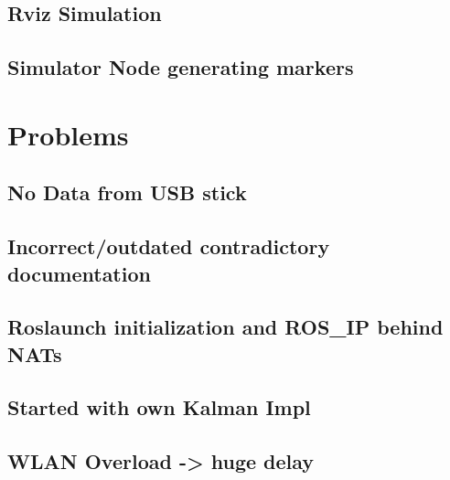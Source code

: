\subsection{Rviz Simulation}
\subsection{Simulator Node generating markers}
\section{Problems}
\subsection{No Data from USB stick}
\subsection{Incorrect/outdated contradictory documentation}
\subsection{Roslaunch initialization and ROS_IP behind NATs}
\subsection{Started with own Kalman Impl}
\subsection{WLAN Overload -> huge delay}
